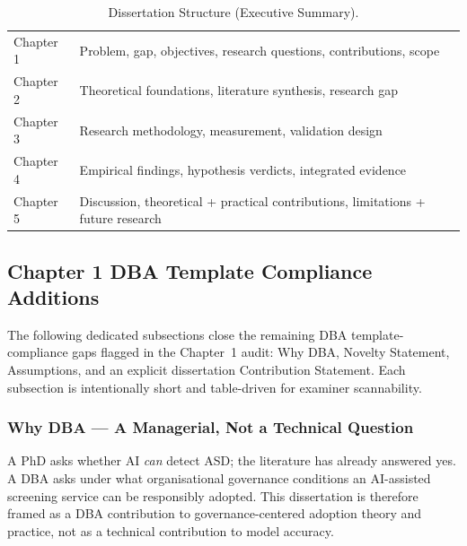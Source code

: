 {\tablestripes\tablefontsize
{}
\begin{xltabular}{\textwidth}{@{} >{\raggedright\arraybackslash}p{6cm} L @{}}
\caption[Dissertation Structure (Executive Summary)]{Dissertation Structure (Executive Summary).}\label{tab:exec_dissertation_structure} \\
\toprule
{} &  \\
\midrule
\endfirsthead
\endhead
\bottomrule
\endlastfoot
Chapter 1 & Problem, gap, objectives, research questions, contributions, scope \\
\addlinespace
Chapter 2 & Theoretical foundations, literature synthesis, research gap \\
\addlinespace
Chapter 3 & Research methodology, measurement, validation design \\
\addlinespace
Chapter 4 & Empirical findings, hypothesis verdicts, integrated evidence \\
\addlinespace
Chapter 5 & Discussion, theoretical + practical contributions, limitations + future research \\
\end{xltabular}}


\subsection{Chapter 1 DBA Template Compliance Additions}
\label{sec:ch1_template_compliance}

\noindent The following dedicated subsections close the remaining DBA template-compliance gaps flagged in the Chapter~1 audit: Why DBA, Novelty Statement, Assumptions, and an explicit dissertation Contribution Statement. Each subsection is intentionally short and table-driven for examiner scannability.

\subsubsection{Why DBA --- A Managerial, Not a Technical Question}
\label{sec:ch1_why_dba_dedicated}

\noindent A PhD asks whether AI \emph{can} detect ASD; the literature has already answered yes. A DBA asks under what organisational governance conditions an AI-assisted screening service can be responsibly adopted. This dissertation is therefore framed as a DBA contribution to governance-centered adoption theory and practice, not as a technical contribution to model accuracy.

